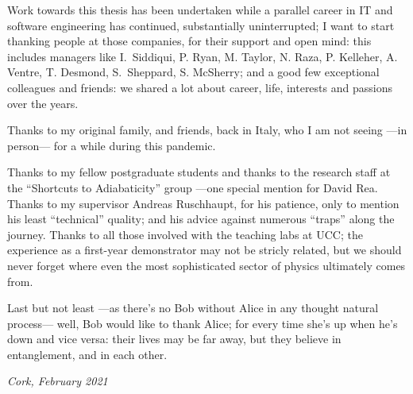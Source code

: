 {
\small
Work towards this thesis has been undertaken while a parallel career
in IT and software engineering has continued,
substantially uninterrupted;
I want to start thanking people at those companies, for their support and open mind:
this includes managers like
I.~Siddiqui, P. Ryan, M. Taylor, N. Raza, P. Kelleher, A. Ventre, T. Desmond, S.~Sheppard, S. McSherry;
and a good few exceptional colleagues and friends: we shared a lot about career, life, interests and passions over the years.

Thanks to my original family, and friends, back in Italy,
who I am not seeing ---in person--- for a while during this pandemic.

Thanks to my fellow postgraduate students
and thanks to the research staff
at the ``Shortcuts to Adiabaticity'' group
---one special mention for David Rea.
Thanks to my supervisor Andreas Ruschhaupt, for his patience,
only to mention his least ``technical'' quality;
and his advice against numerous ``traps'' along the journey.
Thanks to all those involved with the teaching labs at UCC;
the  experience as a  first-year demonstrator may not be stricly related,
but we should never forget where even the most sophisticated sector of physics
ultimately comes from.

Last but not least ---as there's no Bob without Alice in any thought natural process---
well, Bob would like to thank Alice;
for every time she’s up when he’s down and vice versa:
their lives may be far away, but they believe in entanglement, and in each other.

\textit{Cork, February 2021}
}